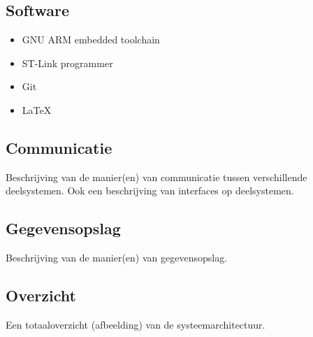 \subsection{Software}
\begin{itemize}
    \item GNU ARM embedded toolchain
    \item ST-Link programmer
    \item Git
    \item LaTeX
\end{itemize}

\subsection{Communicatie}
Beschrijving van de manier(en) van communicatie tussen verschillende
deelsystemen. Ook een beschrijving van interfaces op deelsystemen.

\subsection{Gegevensopslag}
Beschrijving van de manier(en) van gegevensopslag.

\subsection{Overzicht}
Een totaaloverzicht (afbeelding) van de systeemarchitectuur.
